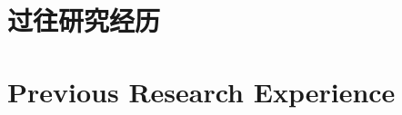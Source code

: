 \ifChinese

\section*{过往研究经历}

\zhlipsum[1-3]

\else  %

\section*{Previous Research Experience}

\lipsum[1-3]

\fi  %
